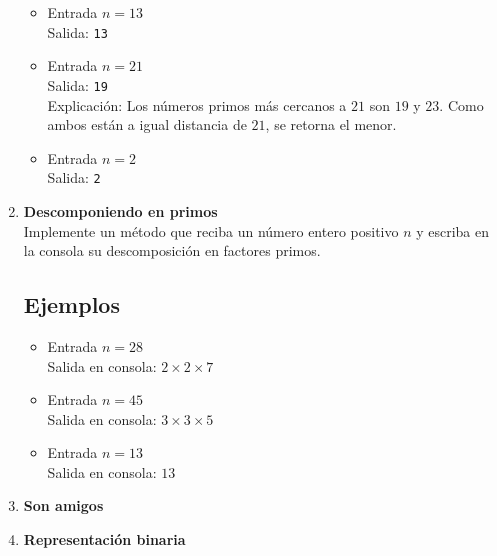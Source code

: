 \begin{enumerate}
\begin{itemize}
        \item Entrada \( n = 13 \)\\
        Salida: \texttt{13}
    
        \item Entrada \( n = 21 \)\\
        Salida: \texttt{19}\\
        Explicación:
        Los números primos más cercanos a \( 21 \) son \( 19 \) y \( 23 \). Como ambos están a igual distancia de \( 21 \), se retorna el menor.
    
        \item Entrada \( n = 2 \)\\
        Salida: \texttt{2}
    \end{itemize}
    

    \item \textbf{Descomponiendo en primos}\\
    Implemente un método que reciba un número entero positivo \( n \) y escriba en la consola su descomposición en factores primos.
    \subsection*{Ejemplos}
    \begin{itemize}
        \item Entrada \( n = 28 \)\\
        Salida en consola: \( 2 \times 2 \times 7 \)
    
        \item Entrada \( n = 45 \)\\
        Salida en consola: \( 3 \times 3 \times 5 \)
    
        \item Entrada \( n = 13 \)\\
        Salida en consola: \( 13 \)
    \end{itemize}
    
    \item \textbf{Son amigos}\\
    

    \item \textbf{Representación binaria}
    
\end{enumerate}

\newpage
